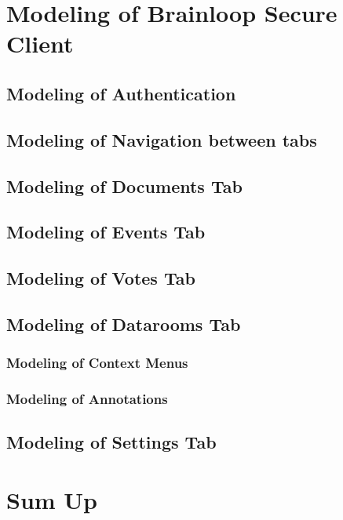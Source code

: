 \section{Modeling of Brainloop Secure Client}


\subsection{Modeling of Authentication}
\subsection{Modeling of Navigation between tabs}
\subsection{Modeling of Documents Tab}
\subsection{Modeling of Events Tab}
\subsection{Modeling of Votes Tab}
\subsection{Modeling of Datarooms Tab}
\subsubsection{Modeling of Context Menus}
\subsubsection{Modeling of Annotations}
\subsection{Modeling of Settings Tab}


\section{Sum Up}















